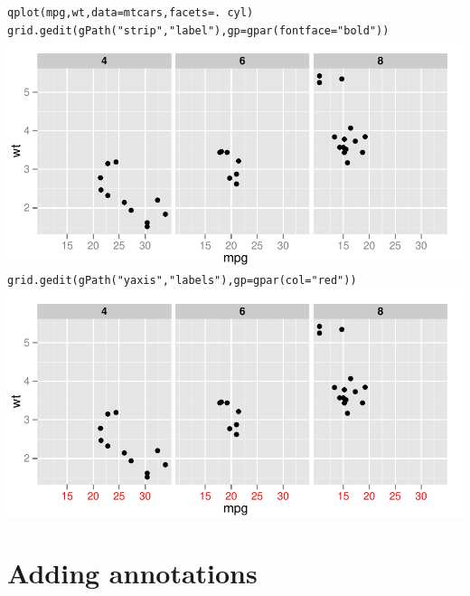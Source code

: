 \begin{alltt}
qplot(mpg, wt, data=mtcars, facets = . ~ cyl)
grid.gedit(gPath("strip","label"), gp=gpar(fontface="bold"))
\includegraphics[scale=0.5]{grid3}
grid.gedit(gPath("yaxis", "labels"), gp=gpar(col="red"))
\includegraphics[scale=0.5]{grid4}
\end{alltt}

% 
% 


\section{Adding annotations}\label{sec:adding_annotation}

